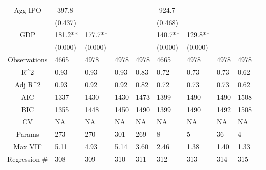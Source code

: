 \documentclass{article}
\begin{document}
\begin{table}[H]
\begin{tabular}{|clllllllll|}
  Agg IPO & -397.8 &  &  &  & -924.7 &  &  &  & \\ 
   & (0.437) &  &  &  & (0.468) &  &  &  & \\ 
  GDP & 181.2** & 177.7** &  &  & 140.7** & 129.8** &  &  & \\ 
   & (0.000) & (0.000) &  &  & (0.000) & (0.000) &  &  & \\ 
  \hline 
 Observations & 4665 & 4978 & 4978 & 4978 & 4665 & 4978 & 4978 & 4978 & \\ 
  R^2 & 0.93 & 0.93 & 0.93 & 0.83 & 0.72 & 0.73 & 0.73 & 0.62 & \\ 
  Adj R^2 & 0.93 & 0.92 & 0.92 & 0.82 & 0.72 & 0.73 & 0.73 & 0.62 & \\ 
  AIC & 1337 & 1430 & 1430 & 1473 & 1399 & 1490 & 1490 & 1508 & \\ 
  BIC & 1355 & 1448 & 1450 & 1490 & 1399 & 1490 & 1492 & 1508 & \\ 
  CV & NA & NA & NA & NA & NA & NA & NA & NA & \\ 
  Params & 273 & 270 & 301 & 269 & 8 & 5 & 36 & 4 & \\ 
  Max VIF & 5.11 & 4.93 & 5.14 & 3.60 & 2.46 & 1.38 & 1.40 & 1.33 & \\ 
  Regression \# & 308 & 309 & 310 & 311 & 312 & 313 & 314 & 315 & \\ 
   \hline
\end{tabular}
 
\end{table}
\end{document}
